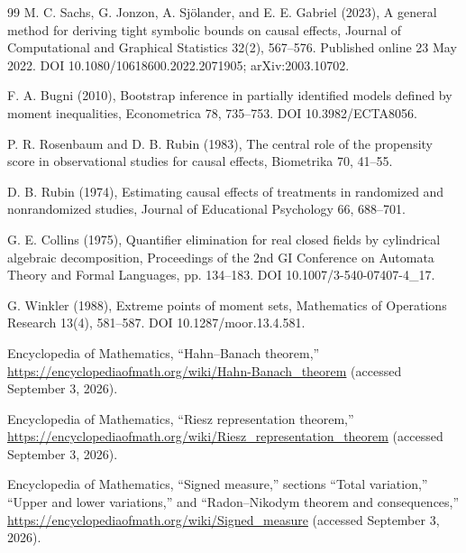 \documentclass{article}
\begin{document}
\begin{thebibliography}{99}
   M. C. Sachs, G. Jonzon, A. Sjölander, and E. E. Gabriel (2023), A general method for deriving tight symbolic bounds on causal effects, Journal of Computational and Graphical Statistics 32(2), 567--576. Published online 23 May 2022. DOI 10.1080/10618600.2022.2071905; arXiv:2003.10702.

   F. A. Bugni (2010), Bootstrap inference in partially identified models defined by moment inequalities, Econometrica 78, 735--753. DOI 10.3982/ECTA8056.

   P. R. Rosenbaum and D. B. Rubin (1983), The central role of the propensity score in observational studies for causal effects, Biometrika 70, 41--55.

   D. B. Rubin (1974), Estimating causal effects of treatments in randomized and nonrandomized studies, Journal of Educational Psychology 66, 688--701.

   G. E. Collins (1975), Quantifier elimination for real closed fields by cylindrical algebraic decomposition, Proceedings of the 2nd GI Conference on Automata Theory and Formal Languages, pp. 134--183. DOI 10.1007/3-540-07407-4\_17.

   G. Winkler (1988), Extreme points of moment sets, Mathematics of Operations Research 13(4), 581--587. DOI 10.1287/moor.13.4.581.

   Encyclopedia of Mathematics, ``Hahn--Banach theorem,'' \url{https://encyclopediaofmath.org/wiki/Hahn-Banach\_theorem} (accessed September 3, 2026).

   Encyclopedia of Mathematics, ``Riesz representation theorem,'' \url{https://encyclopediaofmath.org/wiki/Riesz\_representation\_theorem} (accessed September 3, 2026).

   Encyclopedia of Mathematics, ``Signed measure,'' sections ``Total variation,'' ``Upper and lower variations,'' and ``Radon--Nikodym theorem and consequences,'' \url{https://encyclopediaofmath.org/wiki/Signed\_measure} (accessed September 3, 2026).

\end{thebibliography}
\end{document}
